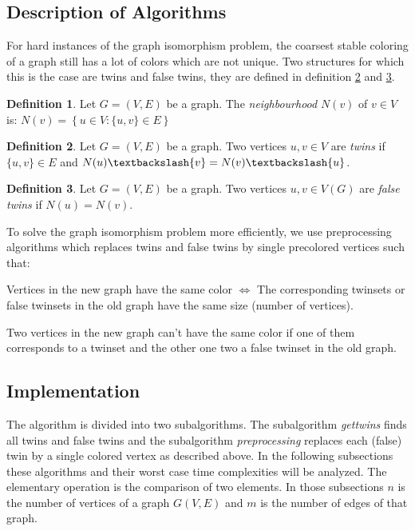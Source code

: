 \documentclass[twoside]{article}
\theoremstyle{definition}
\newtheorem{definition}{Definition}
\theoremstyle{plain}
\begin{document}
\begin{multicols}{2}
\section{Description of Algorithms}
For hard instances of the graph isomorphism problem, the coarsest stable coloring of a graph still has a lot of colors which are not unique. Two structures for which this is the case are twins and false twins, they are defined in definition \ref{deftwins} and \ref{deffalsetwins}.
\begin{definition}
Let $G = (V,E)$ be a graph. The \emph{neighbourhood} $N(v)$ of $v \in V$ is:
$N(v) = \left\{{u \in V : \{u,v\} \in E}\right\}$
\end{definition}
\begin{definition}\label{deftwins}
Let $G = (V,E)$ be a graph.
Two vertices $u, v \in V$ are \emph{twins} if $\{u,v\} \in E$ and $N(u)\textbackslash \{v\} = N(v)\textbackslash \{u\}$.
\end{definition}
\begin{definition}\label{deffalsetwins}
Let $G = (V,E)$ be a graph.
Two vertices $u, v \in V(G)$ are \emph{false twins} if $N(u) = N(v).$
\end{definition}

To solve the graph isomorphism problem more efficiently, we use preprocessing algorithms which replaces twins and false twins by single precolored vertices such that:
\begin{compactenum}
\item Vertices in the new graph have the same color $\iff$ The corresponding twinsets or false twinsets in the old graph have the same size (number of vertices).
\item Two vertices in the new graph can't have the same color if one of them corresponds to a twinset and the other one two a false twinset in the old graph.
\end{compactenum}

\subsection{Implementation}
The algorithm is divided into two subalgorithms. The subalgorithm \emph{gettwins} finds all twins and false twins and the subalgorithm \emph{preprocessing} replaces each (false) twin by a single colored vertex as described above. In the following subsections these algorithms and their worst case time complexities will be analyzed. The elementary operation is the comparison of two elements. In those subsections $n$ is the number of vertices of a graph $G(V,E)$ and $m$ is the number of edges of that graph.


\end{multicols}
\end{document}
